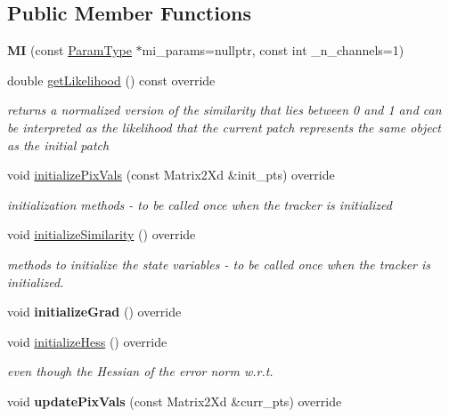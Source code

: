 \subsection*{Public Member Functions}
\begin{DoxyCompactItemize}
\item 
\hypertarget{classMI_a0458d0b7cc25417a28d62e750458cf78}{{\bfseries M\-I} (const \hyperlink{structMIParams}{Param\-Type} $\ast$mi\-\_\-params=nullptr, const int \-\_\-n\-\_\-channels=1)}\label{classMI_a0458d0b7cc25417a28d62e750458cf78}

\item 
\hypertarget{classMI_adfcccf284d9a8d11f86cf15f08f4c4e0}{double \hyperlink{classMI_adfcccf284d9a8d11f86cf15f08f4c4e0}{get\-Likelihood} () const override}\label{classMI_adfcccf284d9a8d11f86cf15f08f4c4e0}

\begin{DoxyCompactList}\small\item\em returns a normalized version of the similarity that lies between 0 and 1 and can be interpreted as the likelihood that the current patch represents the same object as the initial patch \end{DoxyCompactList}\item 
\hypertarget{classMI_a363dd140a83f6e452a1b4cd2cd567df2}{void \hyperlink{classMI_a363dd140a83f6e452a1b4cd2cd567df2}{initialize\-Pix\-Vals} (const Matrix2\-Xd \&init\-\_\-pts) override}\label{classMI_a363dd140a83f6e452a1b4cd2cd567df2}

\begin{DoxyCompactList}\small\item\em initialization methods -\/ to be called once when the tracker is initialized \end{DoxyCompactList}\item 
void \hyperlink{classMI_adbc0fd790fc98e2bc1b9ffcdf96ec13a}{initialize\-Similarity} () override
\begin{DoxyCompactList}\small\item\em methods to initialize the state variables -\/ to be called once when the tracker is initialized. \end{DoxyCompactList}\item 
\hypertarget{classMI_a112dcaa57e51544c4ace9203f697ea78}{void {\bfseries initialize\-Grad} () override}\label{classMI_a112dcaa57e51544c4ace9203f697ea78}

\item 
void \hyperlink{classMI_aa262920efc3c0c6e85ed4d609f11a94d}{initialize\-Hess} () override
\begin{DoxyCompactList}\small\item\em even though the Hessian of the error norm w.\-r.\-t. \end{DoxyCompactList}\item 
\hypertarget{classMI_aeb3d257ecf5ed4086524cba64dcf2797}{void {\bfseries update\-Pix\-Vals} (const Matrix2\-Xd \&curr\-\_\-pts) override}\label{classMI_aeb3d257ecf5ed4086524cba64dcf2797}


\end{DoxyCompactItemize}
